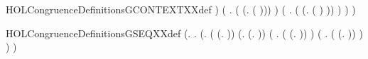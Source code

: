 \begin{SaveVerbatim}{HOLCongruenceDefinitionsGCONTEXTXXdef}
                       ) \HOLSymConst{\HOLTokenDisj{}}
                 (\HOLSymConst{\HOLTokenExists{}} . ( \HOLSymConst{=} (\HOLTokenLambda{}. \HOLConst{\ensuremath{\nu}}  ( ))) \HOLSymConst{\HOLTokenConj{}}  ) \HOLSymConst{\HOLTokenDisj{}}
                 (\HOLSymConst{\HOLTokenExists{}} .
                      ( \HOLSymConst{=} (\HOLTokenLambda{}.  ( ) )) \HOLSymConst{\HOLTokenConj{}}  ) \HOLSymConst{\HOLTokenImp{}}
                  ) \HOLSymConst{\HOLTokenImp{}}
             )
\end{SaveVerbatim}
\newcommand{\HOLCongruenceDefinitionsGCONTEXTXXdef}{\UseVerbatim{HOLCongruenceDefinitionsGCONTEXTXXdef}}
\begin{SaveVerbatim}{HOLCongruenceDefinitionsGSEQXXdef}
\HOLTokenTurnstile{}  \HOLSymConst{=}
   (\HOLTokenLambda{}.
        \HOLSymConst{\HOLTokenForall{}}.
            (\HOLSymConst{\HOLTokenForall{}}.
                 ( \HOLSymConst{=} (\HOLTokenLambda{}. )) \HOLSymConst{\HOLTokenDisj{}} (\HOLSymConst{\HOLTokenExists{}}.  \HOLSymConst{=} (\HOLTokenLambda{}. )) \HOLSymConst{\HOLTokenDisj{}}
                 (\HOLSymConst{\HOLTokenExists{}} . ( \HOLSymConst{=} (\HOLTokenLambda{}.  )) \HOLSymConst{\HOLTokenConj{}}  ) \HOLSymConst{\HOLTokenDisj{}}
                 (\HOLSymConst{\HOLTokenExists{}}   .
                      ( \HOLSymConst{=} (\HOLTokenLambda{}.   \HOLSymConst{+}  )) \HOLSymConst{\HOLTokenConj{}}
                        \HOLSymConst{\HOLTokenConj{}}  ) \HOLSymConst{\HOLTokenImp{}}
                  ) \HOLSymConst{\HOLTokenImp{}}
             )
\end{SaveVerbatim}
